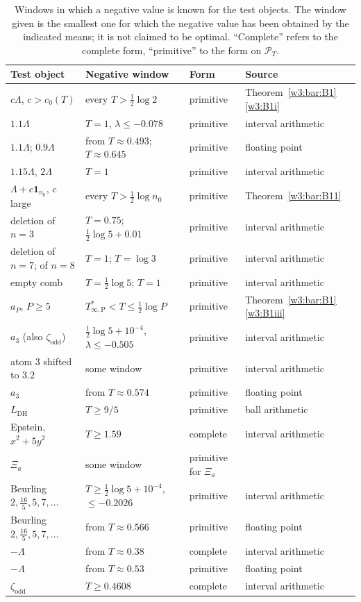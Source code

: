 \documentclass[11pt]{amsart}
\theoremstyle{definition}
\theoremstyle{remark}
\numberwithin{equation}{section}
\newcommand{\PT}{\mathcal{P}_T}                        %
\newcommand{\Tarch}{T^{*}_{\infty,\mathrm P}}          %
\begin{document}
\begin{table}[htbp]
\centering\small
\caption{Windows in which a negative value is known for the test objects. The window given is the smallest one for
which the negative value has been obtained by the indicated means; it is not claimed to be optimal. ``Complete''
refers to the complete form, ``primitive'' to the form on $\PT$.}\label{w3:tab:falsifiers}
\begin{tabular}{llll}
\toprule
Test object & Negative window & Form & Source\\
\midrule
$c\Lambda$, $c>c_0(T)$ & every $T>\frac12\log2$ & primitive & Theorem~\ref{w3:bar:B1}\ref{w3:B1i}\\
$1.1\Lambda$ & $T=1$, $\lambda\le-0.078$ & primitive & interval arithmetic\\
$1.1\Lambda$; $0.9\Lambda$ & from $T\approx0.493$; $T\approx0.645$ & primitive & floating point\\
$1.15\Lambda$, $2\Lambda$ & $T=1$ & primitive & interval arithmetic\\
$\Lambda+c\mathbf 1_{n_0}$, $c$ large & every $T>\frac12\log n_0$ & primitive & Theorem~\ref{w3:bar:B11}\\
deletion of $n=3$ & $T=0.75$; $\frac12\log5+0.01$ & primitive & interval arithmetic\\
deletion of $n=7$; of $n=8$ & $T=1$; $T=\log3$ & primitive & interval arithmetic\\
empty comb & $T=\frac12\log5$; $T=1$ & primitive & interval arithmetic\\
$a_P$, $P\ge5$ & $\Tarch<T\le\frac12\log P$ & primitive & Theorem~\ref{w3:bar:B1}\ref{w3:B1iii}\\
$a_3$ (also $\zeta_{\mathrm{odd}}$) & $\frac12\log5+10^{-4}$, $\lambda\le-0.505$ & primitive & interval arithmetic\\
atom $3$ shifted to $3.2$ & some window & primitive & interval arithmetic\\
$a_3$ & from $T\approx0.574$ & primitive & floating point\\
$L_{\mathrm{DH}}$ & $T\ge9/5$ & primitive & ball arithmetic\\
Epstein, $x^2+5y^2$ & $T\ge1.59$ & complete & interval arithmetic\\
$\Xi_a$ & some window & primitive for $\Xi_a$ & \cite[Proposition~9.3]{P47}\\
Beurling $2,\frac{16}5,5,7,\dots$ & $T\ge\frac12\log5+10^{-4}$, $\le-0.2026$ & primitive & interval arithmetic\\
Beurling $2,\frac{16}5,5,7,\dots$ & from $T\approx0.566$ & primitive & floating point\\
$-\Lambda$ & from $T\approx0.38$ & complete & interval arithmetic\\
$-\Lambda$ & from $T\approx0.53$ & primitive & floating point\\
$\zeta_{\mathrm{odd}}$ & $T\ge0.4608$ & complete & interval arithmetic\\
\bottomrule
\end{tabular}
\end{table}
\end{document}
